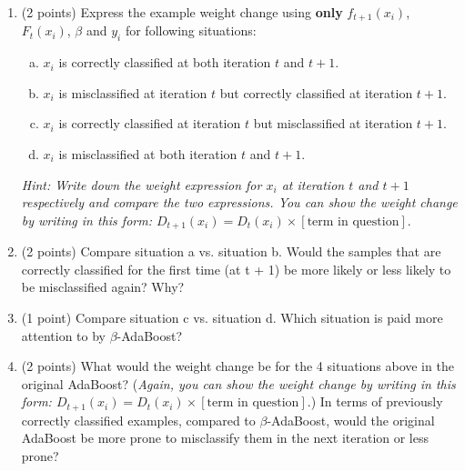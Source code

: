 \documentclass[11pt]{article}
\begin{document}
\begin{enumerate}[(1)]

\item (2 points) Express the example weight change using \textbf{only} $f_{t+1}(x_i)$, $F_t(x_i)$, $\beta$ and $y_i$ for following situations:
\begin{enumerate}[a.]
    \item $x_i$ is correctly classified at both iteration $t$ and $t+1$.
    \item $x_i$ is misclassified at iteration $t$ but correctly classified at iteration $t+1$.
    \item $x_i$ is correctly classified at iteration $t$ but misclassified at iteration $t+1$.
    \item $x_i$ is misclassified at both iteration $t$ and $t+1$.
\end{enumerate}
\textit{Hint: Write down the weight expression for $x_i$ at iteration $t$ and $t+1$ respectively and compare the two expressions. You can show the weight change by writing in this form: $D_{t+1}(x_i) = D_t(x_i) \times [\text{term in question}].$}\\
\begin{answertext}{9cm}{}

\end{answertext}
\item (2 points)  Compare situation a vs. situation b. Would the samples that are correctly classified for the first time (at t + 1) be more likely or less likely to be misclassified again? Why?

\begin{answertext}{9cm}{}
    
\end{answertext}

\item (1 point) Compare situation c vs. situation d. Which situation is paid more attention to by $\beta$-AdaBoost? 

\begin{answertext}{8cm}{}
   
\end{answertext}

\newpage
\item (2 points) What would the weight change be for the 4 situations above in the original AdaBoost? (\textit{Again, you can show the weight change by writing in this form: $D_{t+1}(x_i) = D_t(x_i) \times [\text{term in question}].$}) In terms of  previously correctly classified examples, compared to $\beta$-AdaBoost, would the original AdaBoost be more prone to misclassify them in the next iteration or less prone? 

\begin{answertext}{20cm}{}

    
\end{answertext}

\end{enumerate}
\end{document}
